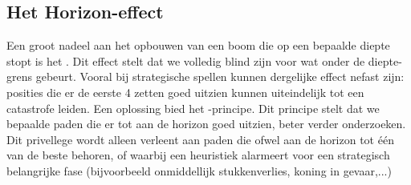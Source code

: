 \subsection{Het Horizon-effect} 
Een groot nadeel aan het opbouwen van een boom die op een bepaalde diepte stopt is het . Dit effect stelt dat we volledig blind zijn voor wat onder de diepte-grens gebeurt. Vooral bij strategische spellen kunnen dergelijke effect nefast zijn: posities die er de eerste 4 zetten goed uitzien kunnen uiteindelijk tot een catastrofe leiden. Een oplossing bied het -principe. Dit principe stelt dat we bepaalde paden die er tot aan de horizon goed uitzien, beter verder onderzoeken. Dit privellege wordt alleen verleent aan paden die ofwel aan de horizon tot één van de beste behoren, of waarbij een heuristiek alarmeert voor een strategisch belangrijke fase (bijvoorbeeld onmiddellijk stukkenverlies, koning in gevaar,...)
